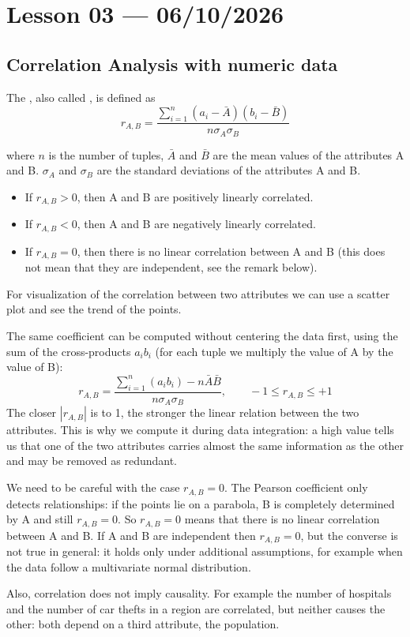 \section{Lesson 03 --- 06/10/2026}

\subsection{Correlation Analysis with numeric data}
The , also called , is defined as
\[
    r_{A,B} = \frac{\sum_{i=1}^{n}(a_i-\bar{A})(b_i-\bar{B})}{n\sigma_A\sigma_B}
\]

where $n$ is the number of tuples, $\bar{A}$ and $\bar{B}$ are the mean values of the attributes A and B. $\sigma_A$ and $\sigma_B$ are 
the standard deviations of the attributes A and B. 

\begin{itemize}
    \item If $r_{A,B}>0$, then A and B are positively linearly correlated.
    \item If $r_{A,B}<0$, then A and B are negatively linearly correlated.
    \item If $r_{A,B}=0$, then there is no linear correlation between A and B (this does not mean that they are independent, see the remark below).
\end{itemize}

For visualization of the correlation between two attributes we can use a scatter plot and see the trend of the points.

The same coefficient can be computed without centering the data first, using the sum of the cross-products $a_ib_i$ (for each tuple we multiply the value of A by the value of B):
\[
    r_{A,B} = \frac{\sum_{i=1}^{n}(a_ib_i)-n\bar{A}\bar{B}}{n\sigma_A\sigma_B}, \qquad -1 \leq r_{A,B} \leq +1
\]
The closer $|r_{A,B}|$ is to 1, the stronger the linear relation between the two attributes. This is why we compute it during data integration: a high value tells us that one of the two attributes carries almost the same information as the other and may be removed as redundant.

\begin{remark}
We need to be careful with the case $r_{A,B}=0$. The Pearson coefficient only detects  relationships: if the points lie on a parabola, B is completely determined by A and still $r_{A,B}=0$. So $r_{A,B}=0$ means that there is no linear correlation between A and B. If A and B are independent then $r_{A,B}=0$, but the converse is not true in general: it holds only under additional assumptions, for example when the data follow a multivariate normal distribution.

Also, correlation does not imply causality. For example the number of hospitals and the number of car thefts in a region are correlated, but neither causes the other: both depend on a third attribute, the population.
\end{remark}

